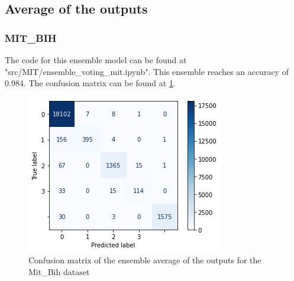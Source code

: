 \documentclass[11pt]{scrartcl}
\begin{document}
\subsection{Average of the outputs}
\subsubsection{MIT\_BIH}
The code for this ensemble model can be found at "src/MIT/ensemble\_voting\_mit.ipynb".
This ensemble reaches an accuracy of 0.984. The confusion matrix can be found at \ref{fig:confusion_voting_mit}.
\begin{figure}[htp]
\centering
\includegraphics[width=.50\textwidth]{../models_performance_graphs/mit/ensemble_voting_confusion_mit.png}
\caption{Confusion matrix of the ensemble average of the outputs for the Mit\_Bih dataset}
\label{fig:confusion_voting_mit}
\end{figure}

\end{document}
